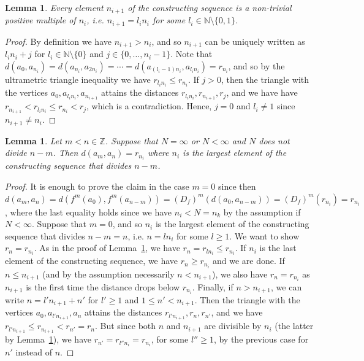 \documentclass[10pt,a4paper]{article}
\newtheorem{lm}[tw]{Lemma}
\theoremstyle{definition}
\theoremstyle{remark}
\newcommand \set [1]{\{#1\}}
\newcommand \N {\mathbb{N}}
\newcommand \Z {\mathbb{Z}}
\begin{document}
\begin{lm} \label{thm:constructing_sequence}
    Every element $n_{i + 1}$ of the constructing sequence is a non-trivial positive multiple of $n_i$, i.e. $n_{i + 1} = l_i n_i$ for some $l_i \in \N \setminus \set{0, 1}$.
\end{lm}
\begin{proof}
    By definition we have $n_{i + 1} > n_i$, and so $n_{i + 1}$ can be uniquely written as $l_i n_i + j$ for $l_i \in \N \setminus \set{0}$ and $j \in \set{0, \ldots, n_i - 1}$.
    Note that $d(a_0, a_{n_i}) = d(a_{n_i}, a_{2n_i}) = \cdots = d(a_{(l_i - 1) n_i}, a_{l_i n_i}) = r_{n_i}$, and so by the ultrametric triangle inequality we have $r_{l_i n_i} \leq r_{n_i}$.
    If $j > 0$, then the triangle with the vertices $a_0, a_{l_i n_i}, a_{n_{i + 1}}$ attains the distances $r_{l_i n_i}, r_{n_{i + 1}}, r_j$, and we have have $r_{n_{i + 1}} < r_{l_i n_i} \leq r_{n_i} < r_j$, which is a contradiction.
    Hence, $j = 0$ and $l_i \neq 1$ since $n_{i + 1} \neq n_i$.
\end{proof}

\begin{lm} \label{thm:horizontal_distances}
     Let $m < n \in \Z$.  Suppose that $N=\infty$ or $N<\infty$ and $N$ does not divide $n - m$. Then  $d(a_m, a_n) = r_{n_i}$ where $n_i$ is the largest element of the constructing sequence that divides $n - m$.
\end{lm}
\begin{proof}
    It is enough to prove the claim in the case $m = 0$ since then $d(a_m, a_n) = d(f^m(a_0), f^m(a_{n - m})) = (D_f)^m(d(a_0, a_{n - m})) = (D_f)^m(r_{n_i}) = r_{n_i}$, where the last equality holds since we have $n_i < N = n_k$ by the assumption if $N < \infty$.
    Suppose that $m = 0$, and so $n_i$ is the largest element of the constructing sequence that divides $n - m = n$, i.e. $n = l n_i$ for some $l \geq 1$.
    We want to show $r_n = r_{n_i}$.
    As in the proof of Lemma~\ref{thm:constructing_sequence}, we have $r_n = r_{l n_i} \leq r_{n_i}$.
    If $n_i$ is the last element of the constructing sequence, we have $r_n \geq r_{n_i}$ and we are done.
    If $n \leq n_{i + 1}$ (and by the assumption necessarily $n < n_{i + 1}$), we also have $r_n = r_{n_i}$ as $n_{i + 1}$ is the first time the distance drops below $r_{n_i}$.
    Finally, if $n > n_{i + 1}$, we can write $n = l' n_{i + 1} + n'$ for $l' \geq 1$ and $1 \leq n' < n_{i + 1}$.
    Then the triangle with the vertices $a_0, a_{l' n_{i + 1}}, a_n$ attains the distances $r_{l' n_{i + 1}}, r_n, r_{n'}$, and we have $r_{l' n_{i + 1}} \leq r_{n_{i + 1}} < r_{n'} = r_n$.
    But since both $n$ and $n_{i + 1}$ are divisible by $n_i$ (the latter by Lemma~\ref{thm:constructing_sequence}), we have $r_{n'} = r_{l'' n_i} = r_{n_i}$, for some $l''\geq 1$, by the previous case for $n'$ instead of $n$.
\end{proof}
\end{document}
